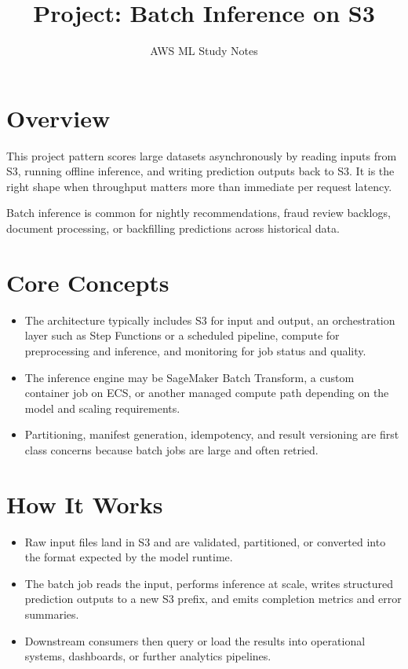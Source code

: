 \documentclass[10pt,twocolumn]{article}
\begin{document}
\title{\vspace{-1.6cm}Project: Batch Inference on S3}
\author{AWS ML Study Notes}
\date{}
\maketitle
\small

\section*{Overview}
This project pattern scores large datasets asynchronously by reading inputs from S3, running offline inference, and writing prediction outputs back to S3. It is the right shape when throughput matters more than immediate per request latency.

Batch inference is common for nightly recommendations, fraud review backlogs, document processing, or backfilling predictions across historical data.

\section*{Core Concepts}
\begin{itemize}
\item The architecture typically includes S3 for input and output, an orchestration layer such as Step Functions or a scheduled pipeline, compute for preprocessing and inference, and monitoring for job status and quality.
\item The inference engine may be SageMaker Batch Transform, a custom container job on ECS, or another managed compute path depending on the model and scaling requirements.
\item Partitioning, manifest generation, idempotency, and result versioning are first class concerns because batch jobs are large and often retried.
\end{itemize}

\section*{How It Works}
\begin{itemize}
\item Raw input files land in S3 and are validated, partitioned, or converted into the format expected by the model runtime.
\item The batch job reads the input, performs inference at scale, writes structured prediction outputs to a new S3 prefix, and emits completion metrics and error summaries.
\item Downstream consumers then query or load the results into operational systems, dashboards, or further analytics pipelines.
\end{itemize}
\end{document}
